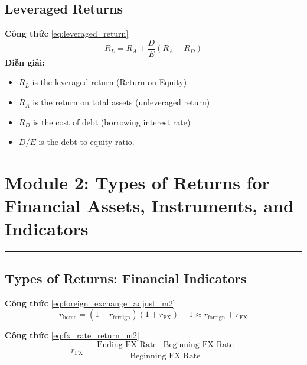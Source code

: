 \subsection*{Leveraged Returns}
\begin{tcolorbox}[colback=blue!3!white, colframe=trustvilleblue!80!black, boxrule=0.5pt, arc=3pt, left=6pt, right=6pt, top=4pt, bottom=4pt, breakable]
\noindent\textbf{Công thức} \eqref{eq:leveraged_return}
\vspace{-0.4em}
\[
R_L = R_A + \frac{D}{E}(R_A - R_D)
\]
\noindent\textbf{Diễn giải:}
\begin{itemize}[leftmargin=1.5em, noitemsep, topsep=2pt, parsep=0pt]
  \item $R_L$ is the leveraged return (Return on Equity)
  \item $R_A$ is the return on total assets (unleveraged return)
  \item $R_D$ is the cost of debt (borrowing interest rate)
  \item $D/E$ is the debt-to-equity ratio.
\end{itemize}
\end{tcolorbox}
\vspace{0.3em}
\section*{Module 2: Types of Returns for Financial Assets, Instruments, and Indicators}
\hrule
\vspace{0.8em}
\subsection*{Types of Returns: Financial Indicators}
\begin{tcolorbox}[colback=blue!3!white, colframe=trustvilleblue!80!black, boxrule=0.5pt, arc=3pt, left=6pt, right=6pt, top=4pt, bottom=4pt, breakable]
\noindent\textbf{Công thức} \eqref{eq:foreign_exchange_adjust_m2}
\vspace{-0.4em}
\[
r_{\text{home}} = (1 + r_{\text{foreign}})(1 + r_{\text{FX}}) - 1 \approx r_{\text{foreign}} + r_{\text{FX}}
\]
\end{tcolorbox}
\vspace{0.3em}
\begin{tcolorbox}[colback=blue!3!white, colframe=trustvilleblue!80!black, boxrule=0.5pt, arc=3pt, left=6pt, right=6pt, top=4pt, bottom=4pt, breakable]
\noindent\textbf{Công thức} \eqref{eq:fx_rate_return_m2}
\vspace{-0.4em}
\[
r_{\text{FX}} = \frac{\text{Ending FX Rate} - \text{Beginning FX Rate}}{\text{Beginning FX Rate}}
\]
\end{tcolorbox}
\vspace{0.3em}
